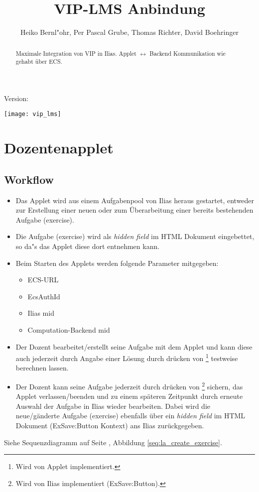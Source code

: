 \documentclass[12pt,a4paper]{article}
\newcommand{\button}[1]{\fbox{\texttt{#1}}}
\begin{document}
\title{VIP-LMS Anbindung}
\author{Heiko Bernl"ohr, Per Pascal Grube, Thomas Richter, David Boehringer}
\maketitle
\begin{center}
  Version: \gitVtag\\
\end{center}
\begin{abstract}
  Maximale Integration von VIP in Ilias. Applet $\leftrightarrow$ Backend
  Kommunikation wie gehabt über ECS.
\end{abstract}

\vspace{\fill}
\begin{center}
\texttt{[image: vip\_lms]}
\end{center}
\vspace{\fill}

\newpage

\section{Dozentenapplet}
\subsection{Workflow}
\begin{itemize}
  \item Das Applet wird aus einem Aufgabenpool von Ilias heraus gestartet,
    entweder zur Erstellung einer neuen oder zum Überarbeitung einer bereits
    bestehenden Aufgabe (exercise).
  \item Die Aufgabe (exercise) wird als \textit{hidden field} im HTML
    Dokument eingebettet, so da"s das Applet diese dort entnehmen kann.
  \item Beim Starten des Applets werden folgende Parameter mitgegeben:
    \begin{itemize}
      \item ECS-URL
      \item EcsAuthId
      \item Ilias mid
      \item Computation-Backend mid
    \end{itemize}
  \item Der Dozent bearbeitet/erstellt seine Aufgabe mit dem Applet und kann
    diese auch jederzeit durch Angabe einer Lösung durch drücken von
    \button{berechnen}\footnote{Wird von Applet implementiert.} testweise
    berechnen lassen.
  \item Der Dozent kann seine Aufgabe jederzeit durch drücken von
    \button{speichern}\footnote{Wird von Ilias implementiert (ExSave:Button).}
    sichern, das Applet verlassen/beenden und zu einem späteren Zeitpunkt durch
    erneute Auswahl der Aufgabe in Ilias wieder bearbeiten. Dabei wird die
    neue/gänderte Aufgabe (exercise) ebenfalls über ein \textit{hidden field}
    im HTML Dokument (ExSave:Button Kontext) ans Ilias zurückgegeben.
\end{itemize}
Siehe Sequenzdiagramm auf Seite \pageref{seq:la_create_exercise}, Abbildung \ref{seq:la_create_exercise}.
\end{document}
